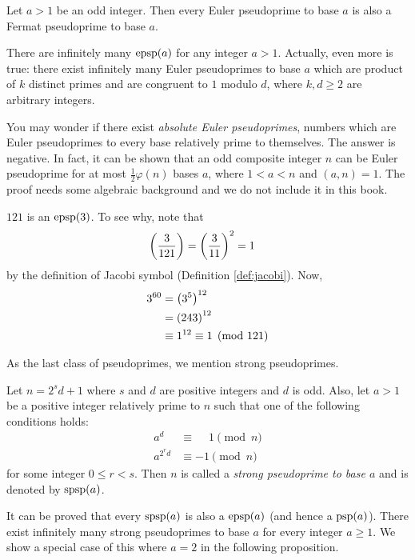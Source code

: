 \begin{corollary}
	Let $a>1$ be an odd integer. Then every Euler pseudoprime to base $a$ is also a Fermat pseudoprime to base $a$.
\end{corollary}

There are infinitely many $\operatorname{epsp}(a)$ for any integer $a>1$. Actually, even more is true: there exist infinitely many Euler pseudoprimes to base $a$ which are product of $k$ distinct primes and are congruent to $1$ modulo $d$, where $k, d \geq 2$ are arbitrary integers.

You may wonder if there exist \textit{absolute Euler pseudoprimes}, numbers which are Euler pseudoprimes to every base relatively prime to themselves. The answer is negative. In fact, it can be shown that an odd composite integer $n$ can be Euler pseudoprime for at most $\frac{1}{2}\varphi(n)$ bases $a$, where $1<a<n$ and $(a,n)=1$. The proof needs some algebraic background and we do not include it in this book.

\begin{example}
	$121$ is an $\operatorname{epsp}(3)$. To see why, note that
		\begin{align*}
			\left(\dfrac{3}{121}\right)
				& = \left(\dfrac{3}{11}\right)^2 = 1
		\end{align*}
	by the definition of Jacobi symbol (Definition \ref{def:jacobi}). Now,
		\begin{align*}
			3^{60}
				& = \left(3^5\right)^{12}\\
				& =\left(243\right)^{12}\\
				& \equiv 1^{12} \equiv 1 \pmod{121}
		\end{align*}
\end{example}

As the last class of pseudoprimes, we mention strong pseudoprimes.

\begin{definition}
	Let $n=2^sd+1$ where $s$ and $d$ are positive integers and $d$ is odd. Also, let $a>1$ be a positive integer relatively prime to $n$ such that one of the following conditions holds:
		\begin{align*}
			a^d
				& \equiv \phantom{-} 1 \pmod n\\
			a^{2^rd} &\equiv -1 \pmod n
		\end{align*}
	for some integer $0 \leq r <s$. Then $n$ is called a \textit{strong pseudoprime to base $a$} and is denoted by $\operatorname{spsp}(a)$.
\end{definition}
It can be proved that every $\operatorname{spsp}(a)$ is also a $\operatorname{epsp}(a)$ (and hence a $\operatorname{psp}(a)$). There exist infinitely many strong pseudoprimes to base $a$ for every integer $a \geq 1$. We show a special case of this where $a=2$ in the following proposition.

